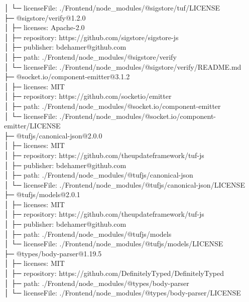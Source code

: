 │  └─ licenseFile: ./Frontend/node\_modules/@sigstore/tuf/LICENSE\\
├─ @sigstore/verify@1.2.0\\
│  ├─ licenses: Apache-2.0\\
│  ├─ repository: https://github.com/sigstore/sigstore-js\\
│  ├─ publisher: bdehamer@github.com\\
│  ├─ path: ./Frontend/node\_modules/@sigstore/verify\\
│  └─ licenseFile: ./Frontend/node\_modules/@sigstore/verify/README.md\\
├─ @socket.io/component-emitter@3.1.2\\
│  ├─ licenses: MIT\\
│  ├─ repository: https://github.com/socketio/emitter\\
│  ├─ path: ./Frontend/node\_modules/@socket.io/component-emitter\\
│  └─ licenseFile: ./Frontend/node\_modules/@socket.io/component-emitter/LICENSE\\
├─ @tufjs/canonical-json@2.0.0\\
│  ├─ licenses: MIT\\
│  ├─ repository: https://github.com/theupdateframework/tuf-js\\
│  ├─ publisher: bdehamer@github.com\\
│  ├─ path: ./Frontend/node\_modules/@tufjs/canonical-json\\
│  └─ licenseFile: ./Frontend/node\_modules/@tufjs/canonical-json/LICENSE\\
├─ @tufjs/models@2.0.1\\
│  ├─ licenses: MIT\\
│  ├─ repository: https://github.com/theupdateframework/tuf-js\\
│  ├─ publisher: bdehamer@github.com\\
│  ├─ path: ./Frontend/node\_modules/@tufjs/models\\
│  └─ licenseFile: ./Frontend/node\_modules/@tufjs/models/LICENSE\\
├─ @types/body-parser@1.19.5\\
│  ├─ licenses: MIT\\
│  ├─ repository: https://github.com/DefinitelyTyped/DefinitelyTyped\\
│  ├─ path: ./Frontend/node\_modules/@types/body-parser\\
│  └─ licenseFile: ./Frontend/node\_modules/@types/body-parser/LICENSE\\
